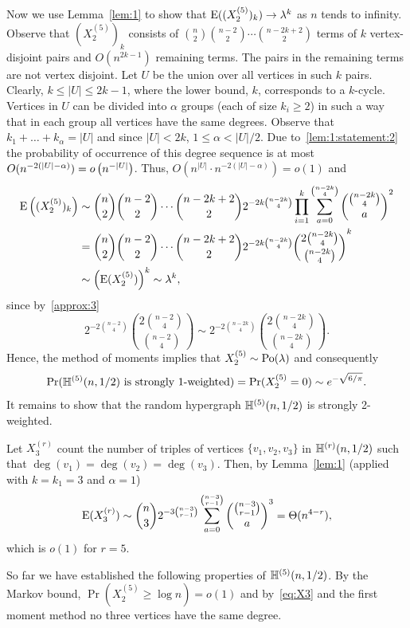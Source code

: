 \documentclass[12pt,reqno]{amsart}
\begin{document}
Now we use Lemma~\ref{lem:1} to show that $\mathrm{E}((X_2^{(5)})_k)\to\lambda^k$ as $n$ tends to infinity. Observe that $(X_2^{(5)})_k$ consists of $\binom{n}{2}\binom{n-2}{2}\cdots\binom{n-2k+2}{2}$ terms of $k$ vertex-disjoint pairs and $O(n^{2k-1})$ remaining terms. The pairs in the remaining terms are not vertex disjoint. Let $U$ be the union over all vertices in such $k$ pairs. Clearly, $k\le |U|\le 2k-1$, where the lower bound, $k$, corresponds to a $k$-cycle. Vertices in $U$ can be divided into $\alpha$ groups (each of size $k_i \ge 2$) in such a way that in each group all vertices have the same degrees. Observe that $k_1+\dots+k_{\alpha} = |U|$ and since $|U|<2k$, $1\le \alpha < |U|/2$. Due to~\eqref{lem:1:statement:2} the probability of occurrence of this degree sequence is at most
$O(n^{-2(|U|-\alpha)}) =o\left(  n^{-|U|} \right)$. Thus, $O(n^{|U|} \cdot  n^{-2(|U|-\alpha)}) = o(1)$ and
\begin{align*}
\mathrm{E}\left((X_2^{(5)})_k\right) &\sim \binom{n}{2}\binom{n-2}{2}\cdots\binom{n-2k+2}{2} 2^{-2k\binom{n-2k}{4}} \prod_{i=1}^{k} \sum_{a=0}^{\binom{n-2k}{4}} \binom{\binom{n-2k}{4}}{a}^{2}\\
&= \binom{n}{2}\binom{n-2}{2}\cdots\binom{n-2k+2}{2} 2^{-2k\binom{n-2k}{4}} \binom{2\binom{n-2k}{4}}{\binom{n-2k}{4}}^{k}\\
&\sim \left( \mathrm{E}(X_2^{(5)}) \right)^k \sim \lambda^k,
\end{align*}
since by~\ref{approx:3}
\[
2^{-2\binom{n-2}{4}}  \binom{2\binom{n-2}{4}}{\binom{n-2}{4}} 
\sim 2^{-2\binom{n-2k}{4}} \binom{2\binom{n-2k}{4}}{\binom{n-2k}{4}}.
\]
Hence, the method of moments implies that $X_2^{(5)} \sim \textrm{Po}(\lambda)$ and consequently
\begin{equation}\label{eq:poisson:1}
\Pr(\mathbb{H}^{({5})}(n,1/2) \text{ is strongly 1-weighted}) = \Pr(X_2^{(5)}=0)\sim e^{-\sqrt{6/\pi}}.
\end{equation}
It remains to show that  \whp the random hypergraph $\mathbb{H}^{({5})}(n,1/2)$ is strongly 2-weighted. 

Let $X_{3}^{(r)}$ count the number of triples of vertices $\{v_1,v_2,v_3\}$ in $\mathbb{H}^{({r})}(n,1/2)$ such that $\deg(v_1)=\deg(v_2)=\deg(v_3)$.
Then, by Lemma~\ref{lem:1} (applied with $k=k_1=3$ and $\alpha=1$)
\begin{equation}\label{eq:X3}
\mathrm{E}(X_3^{(r)}) \sim \binom{n}{3} 2^{-3\binom{n-3}{r-1}} \sum_{a=0}^{\binom{n-3}{r-1}} \binom{\binom{n-3}{r-1}}{a}^3 
= \Theta(n^{4-r}),
\end{equation}
which is $o(1)$ for $r=5$. 

So far we have established the following properties of $\mathbb{H}^{({5})}(n,1/2)$. By the Markov bound, $\Pr(X_2^{(5)} \ge \log n) =o(1)$ and by~\eqref{eq:X3} and the first moment method \whp no three vertices have the same degree. 
\end{document}
